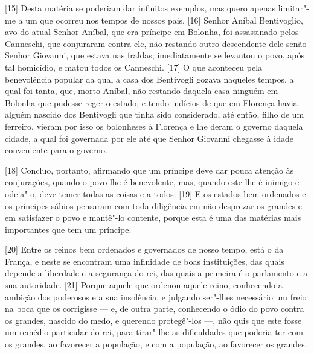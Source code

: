 {[}15{]} Desta
matéria se poderiam dar infinitos exemplos, mas quero apenas limitar"-me
a um que ocorreu nos tempos de nossos pais. {[}16{]} Senhor Aníbal
Bentivoglio, avo do atual Senhor Aníbal, que
era príncipe em Bolonha, foi assassinado pelos Canneschi, que conjuraram contra ele, não
restando outro descendente dele senão Senhor Giovanni, que
estava nas fraldas; imediatamente se levantou o povo, após tal
homicídio, e matou todos os Canneschi. {[}17{]} O que aconteceu pela
benevolência popular da qual a casa dos Bentivogli gozava naqueles
tempos, a qual foi tanta, que, morto Aníbal, não restando daquela casa
ninguém em Bolonha que pudesse reger o estado, e tendo indícios de que
em Florença havia alguém nascido dos Bentivogli que tinha sido considerado, até então, filho de um
ferreiro, vieram por isso os bolonheses à Florença e lhe deram o governo
daquela cidade, a qual foi governada por ele até que Senhor Giovanni
chegasse à idade conveniente para o governo.

{[}18{]} Concluo, portanto, afirmando que um príncipe deve dar pouca
atenção às conjurações, quando o povo lhe é benevolente, mas, quando
este lhe é inimigo e odeia"-o, deve temer todas as coisas e a todos.
{[}19{]} E os estados bem ordenados e os príncipes sábios pensaram com
toda diligência em não desprezar os grandes e em satisfazer o povo e
mantê"-lo contente, porque esta é uma das matérias mais importantes que
tem um príncipe.

{[}20{]} Entre os reinos bem ordenados e governados de nosso tempo, está
o da França, e neste se encontram uma infinidade de boas instituições,
das quais depende a liberdade e a segurança do rei, das quais a primeira
é o parlamento e a sua autoridade. {[}21{]} Porque aquele que ordenou
aquele reino, conhecendo a ambição dos poderosos e a sua insolência, e
julgando ser"-lhes necessário um freio na boca que os corrigisse --- e, de
outra parte, conhecendo o ódio do povo contra os grandes, nascido do medo, e querendo protegê"-los ---, não
quis que este fosse um remédio particular do rei, para tirar"-lhe as
dificuldades que poderia ter com os grandes, ao favorecer a população, e
com a população, ao favorecer os grandes.

